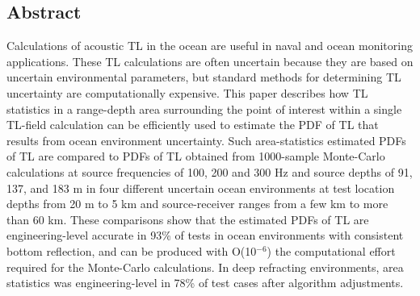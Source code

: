 \subsection{Abstract}
Calculations of acoustic \ac{TL} in the ocean are useful in naval and
ocean monitoring applications. These \ac{TL} calculations are often
uncertain because they are based on uncertain environmental
parameters, but standard methods for determining \ac{TL} uncertainty
are computationally expensive. This paper describes how \ac{TL}
statistics in a range-depth area surrounding the point of interest
within a single \ac{TL}-field calculation can be efficiently used to
estimate the \ac{PDF} of \ac{TL} that results from ocean environment
uncertainty. Such area-statistics estimated \acp{PDF} of \ac{TL} are
compared to PDFs of \ac{TL} obtained from 1000-sample Monte-Carlo
calculations at source frequencies of 100, 200 and 300 Hz and source
depths of 91, 137, and 183 m in four different uncertain ocean
environments at test location depths from 20 m to 5 km and
source-receiver ranges from a few km to more than 60 km. These
comparisons show that the estimated \acp{PDF} of \ac{TL} are
engineering-level accurate in 93\% of tests in ocean environments with
consistent bottom reflection, and can be produced with O(10$^{-6}$)
the computational effort required for the Monte-Carlo calculations. In
deep refracting environments, area statistics was engineering-level in
78\% of test cases after algorithm adjustments.


